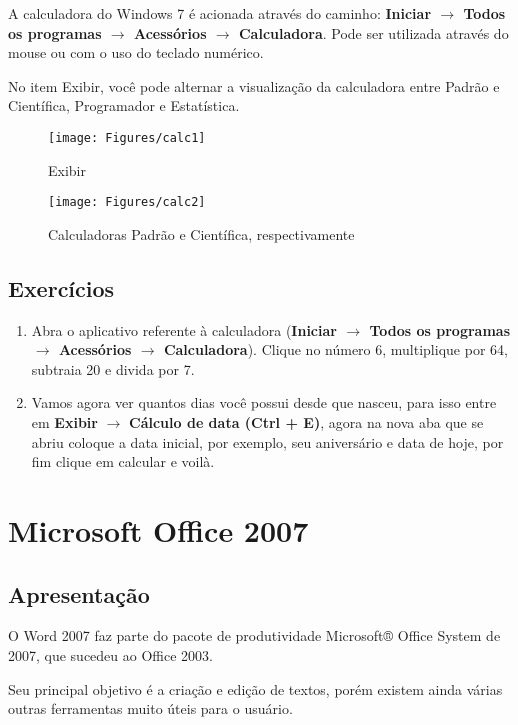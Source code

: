 \documentclass[hidelinks,12pt]{article}
\begin{document}
A calculadora do Windows 7 é acionada através do caminho: {\bf Iniciar $\rightarrow$ Todos os programas $\rightarrow$ Acessórios $\rightarrow$ Calculadora}. Pode ser utilizada através do mouse ou com o uso do teclado numérico.

No item Exibir, você pode alternar a visualização da calculadora entre Padrão e Científica, Programador e Estatística.

\begin{figure}[!h]
	\centering
	\texttt{[image: Figures/calc1]}
	\label{fig:calc1}
	\caption{Exibir}
\end{figure}

\begin{figure}[!h]
	\centering
	\texttt{[image: Figures/calc2]}
	\label{fig:calc2}
	\caption{Calculadoras Padrão e Científica, respectivamente}
\end{figure}

\subsection{Exercícios}

\begin{enumerate}
\item Abra o aplicativo referente à calculadora ({\bf Iniciar $\rightarrow$ Todos os programas $\rightarrow$ Acessórios $\rightarrow$ Calculadora}). Clique no número 6, multiplique por 64, subtraia 20 e divida por 7.

\item Vamos agora ver quantos dias você possui desde que nasceu, para isso entre em \textbf{Exibir} $\rightarrow$ \textbf{Cálculo de data (Ctrl + E)}, agora na nova aba que se abriu coloque a data inicial, por exemplo, seu aniversário e data de hoje, por fim clique em calcular e voilà.
\end{enumerate}

\section{Microsoft Office 2007}

\subsection{Apresentação}

O Word 2007 faz parte do pacote de produtividade Microsoft® Office System de 2007, que sucedeu ao Office 2003.

Seu principal objetivo é a criação e edição de textos, porém existem ainda várias outras ferramentas muito úteis para o usuário.
\end{document}
